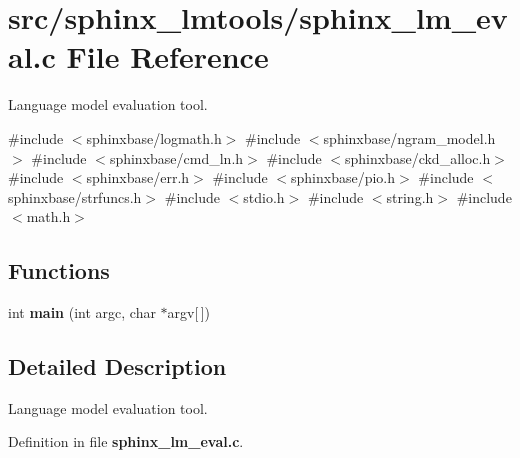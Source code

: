 \section{src/sphinx\-\_\-lmtools/sphinx\-\_\-lm\-\_\-eval.c \-File \-Reference}
\label{sphinx__lm__eval_8c}


\-Language model evaluation tool.  


{\ttfamily \#include $<$sphinxbase/logmath.\-h$>$}\*
{\ttfamily \#include $<$sphinxbase/ngram\-\_\-model.\-h$>$}\*
{\ttfamily \#include $<$sphinxbase/cmd\-\_\-ln.\-h$>$}\*
{\ttfamily \#include $<$sphinxbase/ckd\-\_\-alloc.\-h$>$}\*
{\ttfamily \#include $<$sphinxbase/err.\-h$>$}\*
{\ttfamily \#include $<$sphinxbase/pio.\-h$>$}\*
{\ttfamily \#include $<$sphinxbase/strfuncs.\-h$>$}\*
{\ttfamily \#include $<$stdio.\-h$>$}\*
{\ttfamily \#include $<$string.\-h$>$}\*
{\ttfamily \#include $<$math.\-h$>$}\*
\subsection*{\-Functions}
\begin{DoxyCompactItemize}
\item 
int {\bfseries main} (int argc, char $\ast$argv[$\,$])\label{sphinx__lm__eval_8c_a0ddf1224851353fc92bfbff6f499fa97}

\end{DoxyCompactItemize}


\subsection{\-Detailed \-Description}
\-Language model evaluation tool. 

\-Definition in file {\bf sphinx\-\_\-lm\-\_\-eval.\-c}.

